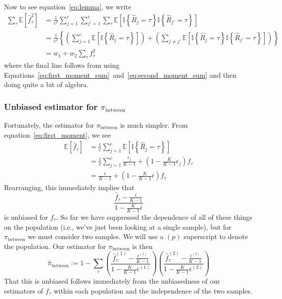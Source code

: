\documentclass[a4paper,fontsize=9pt,DIV=14]{scrartcl}
\newcommand*{\pib}{$\pi_\text{between}$\xspace}
\begin{document}
Now to see equation~\eqref{eq:lemma}, we write
\begin{align*}
\sum_\tau\mathbb{E}\left[\hat{f}_\tau^2\right] &= \frac{1}{c^2}\sum_{j=1}^c \sum_{j'=1}^c \sum_\tau \mathbb{E}\left[\mathbb{I}\left\{\hat{R}_j=\tau\right\}\mathbb{I}\left\{\hat{R}_{j'}=\tau\right\}\right]\\
&= \frac{1}{c^2}\left\{\left(\sum_{j=1}^c \mathbb{E}\left[\mathbb{I}\left\{\hat{R}_j=\tau\right\}\right]\right) + \left( \sum_{j\ne j'}\mathbb{E}\left[\mathbb{I}\left\{\hat{R}_j=\tau\right\}\mathbb{I}\left\{\hat{R}_{j'}=\tau\right\}\right] \right) \right\}\\
&= w_1 + w_2\sum_\tau f_\tau^2
\end{align*}
where the final line follows from using Equations~\eqref{eq:first_moment_sum}~and~\eqref{eq:second_moment_sum} and then doing quite a bit of algebra.


\subsubsection*{Unbiased estimator for \pib}
\label{supp:sec:FST:sub:HeterozygositySequencingError:sub:UnbiasedPIB}

Fortunately, the estimator for \pib is much simpler.  From equation~\eqref{eq:first_moment}, we see
\begin{align*}
\mathbb{E}\left[\hat{f}_\tau\right] &= \frac{1}{c}\sum_{j=1}^c \mathbb{E}\left[\mathbb{I}\left\{\hat{R}_j = \tau\right\}\right]\\
&= \frac{1}{c}\sum_{j=1}^c \frac{\epsilon_j}{K-1} + \left(1 - \frac{K}{K-1}\epsilon_j\right)f_\tau\\
&= \frac{\overline{\epsilon}}{K-1} + \left(1 - \frac{K}{K-1}\overline{\epsilon}\right)f_\tau
\end{align*}
Rearranging, this immediately implies that
\[
\frac{\hat{f}_\tau - \frac{\overline{\epsilon}}{K-1}}{1 - \frac{K}{K-1}\overline{\epsilon}}
\]
is unbiased for $f_\tau$.  So far we have suppressed the dependence of all of these things on the population (i.e., we've just been looking at a single sample), but for \pib we must consider two samples.  We will use a $(p)$ superscript to denote the population.  Our estimator for \pib is then
\[
\widehat{\pi}_\text{between} := 1 - \sum_\tau \left(\frac{\hat{f}^{(1)}_\tau - \frac{\overline{\epsilon}^{(1)}}{K-1}}{1 - \frac{K}{K-1}\overline{\epsilon}^{(1)}}\right)\left(\frac{\hat{f}^{(2)}_\tau - \frac{\overline{\epsilon}^{(2)}}{K-1}}{1 - \frac{K}{K-1}\overline{\epsilon}^{(2)}}\right)
\]
That this is unbiased follows immediately from the unbiasedness of our estimators of $f_\tau$ within each population and the independence of the two samples. 
\end{document}
